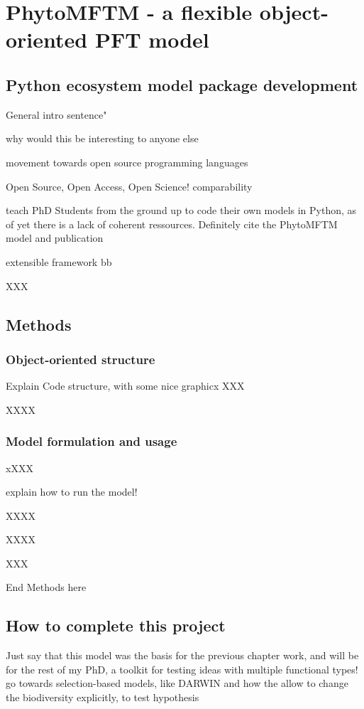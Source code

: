 \chapter{PhytoMFTM - a flexible object-oriented PFT model}

\small {\textbf{}}


\normalsize
\section{Python ecosystem model package development}
General intro sentence" 

why would this be interesting to anyone else


movement towards open source programming languages

Open Source, Open Access, Open Science!
comparability

teach PhD Students from the ground up to code their own models in Python, as of yet there is a lack of coherent ressources. Definitely cite the PhytoMFTM model and publication \citep{AcevedoTrejos2016}

extensible framework
bb



XXX

\section{Methods}



\subsection{Object-oriented structure}
Explain Code structure, with some nice graphicx
XXX

XXXX

\subsection{Model formulation and usage}
xXXX

explain how to run the model!

XXXX

XXXX

XXX


End Methods here

\section{How to complete this project}


Just say that this model was the basis for the previous chapter work, and will be for the rest of my PhD, a toolkit for testing ideas with multiple functional types! go towards selection-based models, like DARWIN
and how the allow to change the biodiversity explicitly, to test hypothesis

